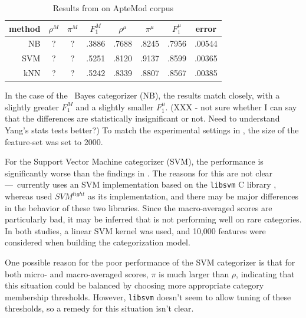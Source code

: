 \begin{table}
\begin{center}
\begin{tabular}{|r c c c c c c c|}
\hline
method & $\rho^M$ & $\pi^M$ & $F_1^M$ & $\rho^\mu$ & $\pi^\mu$ & $F_1^\mu$ & error \\
\hline
NB  & ? & ? & .3886 & .7688 & .8245 & .7956 & .00544 \\
SVM & ? & ? & .5251 & .8120 & .9137 & .8599 & .00365 \\
kNN & ? & ? & .5242 & .8339 & .8807 & .8567 & .00385 \\
\hline
\end{tabular}
\end{center}
\caption{Results from \cite{yang:99} on ApteMod corpus}
\label{aptemod-yang}
\end{table}

In the case of the \naive\ Bayes categorizer (NB), the results match
\cite{yang:99} closely, with a slightly greater $F_1^M$ and a slightly
smaller $F_1^\mu$. (XXX - not sure whether I can say that the
differences are statistically insignificant or not.  Need to
understand Yang's stats tests better?)  To match the experimental
settings in \cite{yang:99}, the size of the feature-set was set to
2000.

For the Support Vector Machine categorizer (SVM), the performance is
significantly worse than the findings in \cite{yang:99}.  The reasons
for this are not clear---\aicat\ currently uses an SVM implementation
based on the \texttt{libsvm} C library \cite{libsvm}, whereas
\cite{yang:99} used $SVM^{light}$ as its
implementation\cite{joachims:99a}, and there may be major differences
in the behavior of these two libraries.  Since the macro-averaged scores are
particularly bad, it may be inferred that \cite{libsvm} is not
performing well on rare categories.  In both studies, a linear SVM
kernel was used, and 10,000 features were considered when building the
categorization model.

One possible reason for the poor performance of the SVM categorizer is
that for both micro- and macro-averaged scores, $\pi$ is much larger
than $\rho$, indicating that this situation could be balanced by
choosing more appropriate category membership thresholds.  However,
\texttt{libsvm} doesn't seem to allow tuning of these thresholds, so a
remedy for this situation isn't clear.

